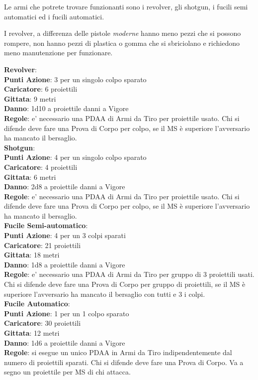 \documentclass[12pt,a4paper,twoside,openany]{book}
\begin{document}
\begin{multicols}{2}
Le armi che potrete trovare funzionanti sono i revolver, gli shotgun, i fucili semi automatici ed i fucili automatici.

I revolver, a differenza delle pistole \textit{moderne} hanno meno pezzi che si possono rompere, non hanno pezzi di plastica o gomma che si sbriciolano e richiedono meno manutenzione per funzionare.

\textbf{Revolver}:\\
\textbf{Punti Azione}: 3 per un singolo colpo sparato\\
\textbf{Caricatore}: 6 proiettili\\
\textbf{Gittata}: 9 metri\\
\textbf{Danno}: 1d10 a proiettile danni a Vigore\\
\textbf{Regole}: e' necessario una PDAA di Armi da Tiro per proiettile usato. Chi si difende deve fare una Prova di Corpo per colpo, se il MS è superiore l'avversario ha mancato il bersaglio.\\

\textbf{Shotgun}:\\
\textbf{Punti Azione}: 4 per un singolo colpo sparato\\
\textbf{Caricatore}: 4 proiettili\\
\textbf{Gittata}: 6 metri\\
\textbf{Danno}: 2d8 a proiettile danni a Vigore\\
\textbf{Regole}: e' necessario una PDAA di Armi da Tiro per proiettile usato. Chi si difende deve fare una Prova di Corpo per colpo, se il MS è superiore l'avversario ha mancato il bersaglio.\\

\textbf{Fucile Semi-automatico}:\\
\textbf{Punti Azione}: 4 per un 3 colpi sparati\\
\textbf{Caricatore}: 21 proiettili\\
\textbf{Gittata}: 18 metri\\
\textbf{Danno}: 1d8 a proiettile danni a Vigore\\
\textbf{Regole}: e' necessario una PDAA di Armi da Tiro per gruppo di 3 proiettili usati. Chi si difende deve fare una Prova di Corpo per gruppo di proiettili, se il MS è superiore l'avversario ha mancato il bersaglio con tutti e 3 i colpi.\\


\textbf{Fucile Automatico}:\\
\textbf{Punti Azione}: 1 per un 1 colpo sparato\\
\textbf{Caricatore}: 30 proiettili\\
\textbf{Gittata}: 12 metri\\
\textbf{Danno}: 1d6 a proiettile danni a Vigore\\
\textbf{Regole}: si esegue un unico PDAA in Armi da Tiro indipendentemente dal numero di proiettili sparati. Chi si difende deve fare una Prova di Corpo. Va a segno un proiettile per MS di chi attacca.


\end{multicols}
\end{document}
